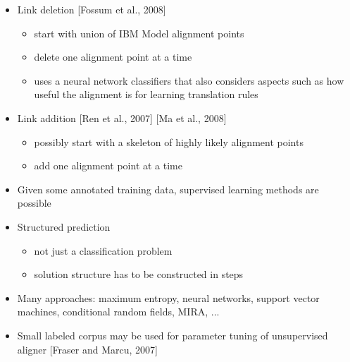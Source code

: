\documentclass[landscape]{slides}
\begin{document}
 
\vspace{15mm}
\begin{itemize}
\item Link deletion [Fossum et al., 2008]
\begin{itemize}
\item start with union of IBM Model alignment points
\item delete one alignment point at a time
\item uses a neural network classifiers that also considers aspects such as how useful the alignment is for learning translation rules
\end{itemize}
\vspace{5mm}
\item Link addition [Ren et al., 2007] [Ma et al., 2008]
\begin{itemize}
\item possibly start with a skeleton of highly likely alignment points
\item add one alignment point at a time
\end{itemize}
\end{itemize}

 
\vspace{10mm}
\begin{itemize}
\item Given some annotated training data, supervised learning methods are possible
\item Structured prediction
\begin{itemize}
\item not just a classification problem
\item solution structure has to be constructed in steps
\end{itemize}
\item Many approaches: maximum entropy, neural networks, support vector machines, conditional random fields, MIRA, ...
\item Small labeled corpus may be used for parameter tuning of unsupervised aligner [Fraser and Marcu, 2007]
\end{itemize}

 
\end{document}
